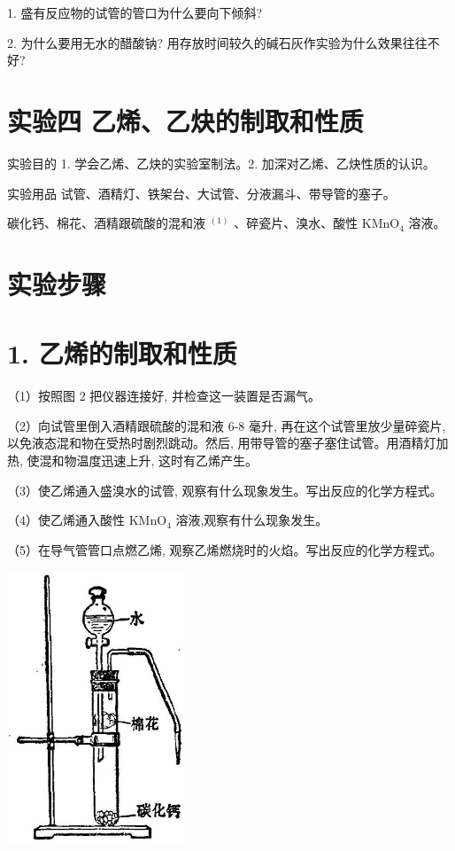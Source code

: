 \documentclass[10pt]{article}
\begin{document}
1. 盛有反应物的试管的管口为什么要向下倾斜?

2. 为什么要用无水的醋酸钠? 用存放时间较久的碱石灰作实验为什么效果往往不好?

\section*{实验四 乙烯、乙炔的制取和性质}

实验目的 1. 学会乙烯、乙炔的实验室制法。2. 加深对乙烯、乙炔性质的认识。

实验用品 试管、酒精灯、铁架台、大试管、分液漏斗、带导管的塞子。

碳化钙、棉花、酒精跟硫酸的混和液 \({}^{\left( 1\right) }\) 、碎瓷片、溴水、酸性 \({\mathrm{{KMnO}}}_{4}\) 溶液。

\section*{实验步骤}

\section*{1. 乙烯的制取和性质}

（1）按照图 2 把仪器连接好, 并检查这一装置是否漏气。

（2）向试管里倒入酒精跟硫酸的混和液 6-8 毫升, 再在这个试管里放少量碎瓷片, 以免液态混和物在受热时剧烈跳动。然后, 用带导管的塞子塞住试管。用酒精灯加热, 使混和物温度迅速上升, 这时有乙烯产生。

（3）使乙烯通入盛溴水的试管, 观察有什么现象发生。写出反应的化学方程式。

（4）使乙烯通入酸性 \({\mathrm{{KMnO}}}_{4}\) 溶液,观察有什么现象发生。

（5）在导气管管口点燃乙烯, 观察乙烯燃烧时的火焰。写出反应的化学方程式。

\begin{center}
\includegraphics[max width=0.4\textwidth]{images/01912d16-be99-77bb-9535-4f3ed8d9946f_213_955950.jpg}
\end{center}
\end{document}
